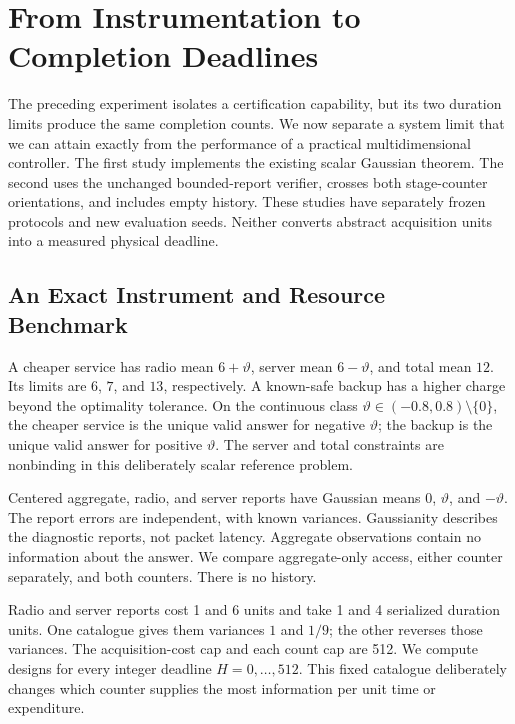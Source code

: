 \section{From Instrumentation to Completion Deadlines}
\label{app:deadline-study}

The preceding experiment isolates a certification capability, but its two
duration limits produce the same completion counts. We now separate a system
limit that we can attain exactly from the performance of a practical
multidimensional controller. The first study implements the existing scalar
Gaussian theorem. The second uses the unchanged bounded-report verifier,
crosses both stage-counter orientations, and includes empty history. These
studies have separately frozen protocols and new evaluation seeds. Neither
converts abstract acquisition units into a measured physical deadline.

\subsection{An Exact Instrument and Resource Benchmark}

A cheaper service has radio mean $6+\vartheta$, server mean
$6-\vartheta$, and total mean $12$. Its limits are $6$, $7$, and $13$,
respectively. A known-safe backup has a higher charge beyond the optimality
tolerance. On the continuous class
$\vartheta\in(-0.8,0.8)\setminus\{0\}$, the cheaper service is the unique
valid answer for negative $\vartheta$; the backup is the unique valid answer
for positive $\vartheta$. The server and total constraints are nonbinding
in this deliberately scalar reference problem.

Centered aggregate, radio, and server reports have Gaussian means
$0$, $\vartheta$, and $-\vartheta$. The report errors are independent, with
known variances. Gaussianity describes the diagnostic reports, not packet
latency. Aggregate observations contain no information about the answer.
We compare aggregate-only access, either counter separately, and both
counters. There is no history.

Radio and server reports cost 1 and 6 units and take 1 and 4 serialized
duration units. One catalogue gives them variances $1$ and $1/9$; the other
reverses those variances. The acquisition-cost cap and each count cap are
512. We compute designs for every integer deadline $H=0,\ldots,512$.
This fixed catalogue deliberately changes which counter supplies the most
information per unit time or expenditure.

